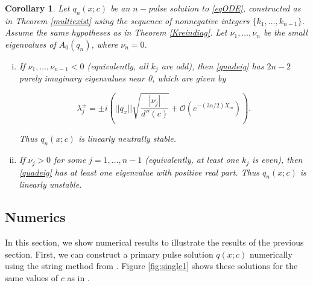 \documentclass[12pt]{article}
\newtheorem{corollary}{Corollary}
\begin{document}
\begin{corollary}\label{stabcrit}
Let $q_n(x; c)$ be an $n-$pulse solution to \eqref{eqODE}, constructed as in Theorem \ref{multiexist} using the sequence of nonnegative integers $\{ k_1, \dots, k_{n-1} \}$. Assume the same hypotheses as in Theorem \ref{Kreindiag}. Let $\nu_1, \dots, \nu_n$ be the small eigenvalues of $A_0(q_n)$, where $\nu_n = 0$.
\begin{enumerate}[(i)]
	\item If $\nu_1, \dots, \nu_{n-1} < 0$ (equivalently, all $k_j$ are odd), then \eqref{quadeig} has $2n - 2$ purely imaginary eigenvalues near 0, which are given by

	\begin{equation}\label{npulseKreineigs}
	\lambda_j^\pm = \pm i \left( ||q_x|| \sqrt{ \frac{|\nu_j|}{d''(c)} } + \mathcal{O}(e^{-(3 \alpha/2) X_m}) \right).
	\end{equation}

	Thus $q_n(x; c)$ is linearly neutrally stable.

	\item If $\nu_j > 0$ for some $j = 1, \dots, n-1$ (equivalently, at least one $k_j$ is even), then \eqref{quadeig} has at least one eigenvalue with positive real part. Thus $q_n(x; c)$ is linearly unstable.
\end{enumerate}

\end{corollary}

\subsection{Numerics}

In this section, we show numerical results to illustrate the results of the previous section. First, we can construct a primary pulse solution $q(x; c)$ numerically using the string method from \cite{Chamard2011}. Figure \ref{fig:single1} shows these solutions for the same values of $c$ as in \cite[Figure 3]{Chen1997}.
\end{document}
